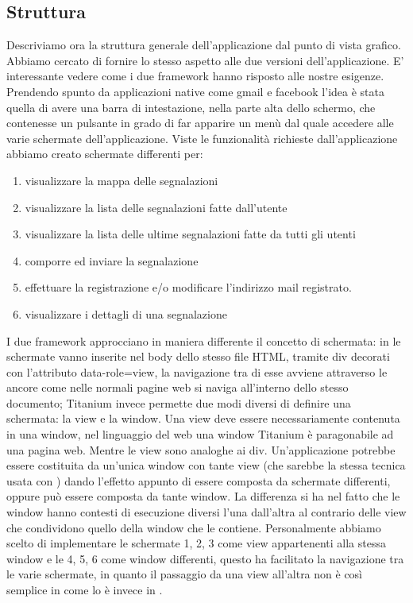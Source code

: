 		\subsection{Struttura}
			Descriviamo ora la struttura generale dell'applicazione dal punto 
			di vista grafico.
			Abbiamo cercato di fornire lo stesso aspetto alle due versioni 
			dell'applicazione. E' interessante vedere come i due framework hanno risposto 
			alle nostre esigenze. Prendendo spunto da applicazioni native come 
			gmail e facebook l'idea è stata quella di avere una barra di intestazione, 
			nella parte alta dello schermo, che contenesse un pulsante in grado di 
			far apparire un menù dal quale accedere alle varie schermate dell'applicazione.
			Viste le funzionalità richieste dall'applicazione abbiamo creato schermate 
			differenti per:
			\begin{enumerate} 
				\item visualizzare la mappa delle segnalazioni 
				\item visualizzare la lista delle segnalazioni fatte dall'utente
				\item visualizzare la lista delle ultime segnalazioni fatte da tutti gli utenti
				\item comporre ed inviare la segnalazione
				\item effettuare la registrazione e/o modificare l'indirizzo mail registrato.
				\item visualizzare i dettagli di una segnalazione
			\end{enumerate}
			
			I due framework approcciano in maniera differente il concetto di schermata: 
			in \kendomob{} le schermate vanno inserite nel body dello stesso 
			file HTML, tramite div decorati con l'attributo data-role=view, la 
			navigazione tra di esse avviene attraverso le ancore come nelle normali 
			pagine web si naviga all'interno dello stesso documento; Titanium invece 
			permette due modi diversi di definire una schermata: la view e la window.
			Una view deve essere necessariamente contenuta in una window, nel linguaggio 
			del web una window Titanium è paragonabile ad una pagina web. Mentre le view 
			sono analoghe ai div. Un'applicazione potrebbe essere costituita da un'unica 
			window con tante view (che sarebbe la stessa tecnica usata con \kendomob{}) 
			dando l'effetto appunto di essere composta da schermate differenti, oppure 
			può essere composta da tante window. La differenza si ha nel fatto che 
			le window hanno contesti di esecuzione diversi l'una dall'altra al contrario 
			delle view che condividono quello della window che le contiene.
			Personalmente abbiamo scelto di implementare le schermate 1, 2, 3 come 
			view appartenenti alla stessa window e le 4, 5, 6 come window differenti, 
			questo ha facilitato la navigazione tra le varie schermate, in quanto 
			il passaggio da una view all'altra non è così semplice in \tisdk{} come 
			lo è invece in \kendomob{}.
			
